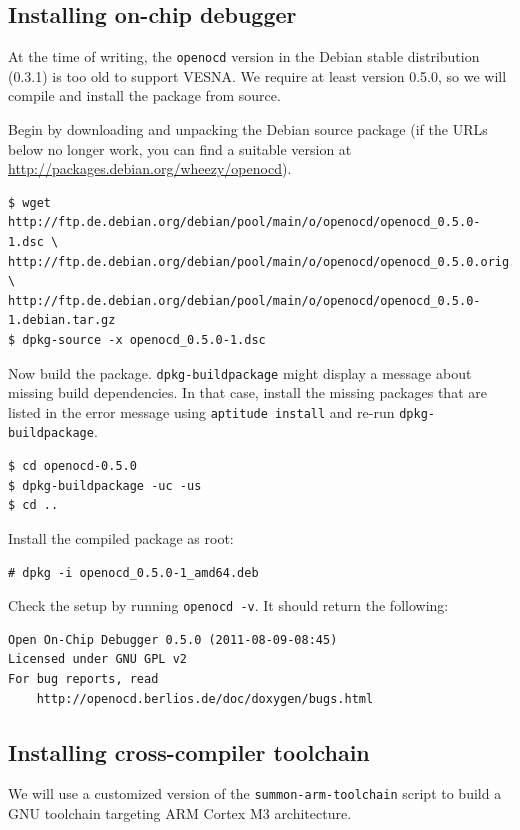 \documentclass[a4paper, 10pt]{article}
\begin{document}
\subsection{Installing on-chip debugger}

At the time of writing, the \verb|openocd| version in the Debian stable
distribution (0.3.1) is too old to support VESNA. We require at least version 0.5.0, so
we will compile and install the package from source.

Begin by downloading and unpacking the Debian source package (if the URLs below
no longer work, you can find a suitable version at
\url{http://packages.debian.org/wheezy/openocd}).

\begin{verbatim}
$ wget http://ftp.de.debian.org/debian/pool/main/o/openocd/openocd_0.5.0-1.dsc \
http://ftp.de.debian.org/debian/pool/main/o/openocd/openocd_0.5.0.orig.tar.bz2 \
http://ftp.de.debian.org/debian/pool/main/o/openocd/openocd_0.5.0-1.debian.tar.gz
$ dpkg-source -x openocd_0.5.0-1.dsc
\end{verbatim}

Now build the package. \verb|dpkg-buildpackage| might display a message about
missing build dependencies. In that case, install the missing packages that are
listed in the error message using \verb|aptitude install| and re-run
\verb|dpkg-buildpackage|.

\begin{verbatim}
$ cd openocd-0.5.0
$ dpkg-buildpackage -uc -us
$ cd ..
\end{verbatim}

Install the compiled package as root:

\begin{verbatim}
# dpkg -i openocd_0.5.0-1_amd64.deb
\end{verbatim}

Check the setup by running \verb|openocd -v|. It should return the following:

\begin{verbatim}
Open On-Chip Debugger 0.5.0 (2011-08-09-08:45)
Licensed under GNU GPL v2
For bug reports, read
	http://openocd.berlios.de/doc/doxygen/bugs.html
\end{verbatim}

\subsection{Installing cross-compiler toolchain}

We will use a customized version of the \verb|summon-arm-toolchain| script to
build a GNU toolchain targeting ARM Cortex M3 architecture.
\end{document}
